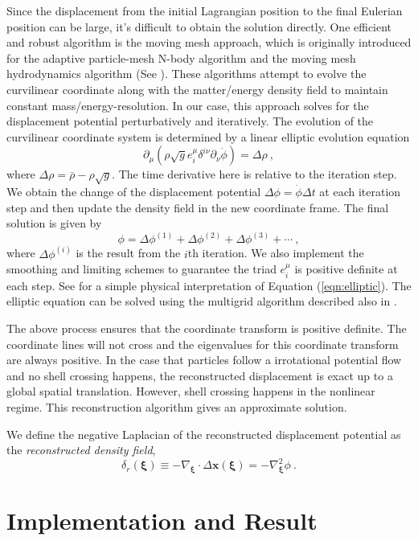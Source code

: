 \documentclass[iop]{emulateapj}
\newcommand{\be}{\begin{equation}}
\newcommand{\ee}{\end{equation}}
\newcommand{\vecx}{{\bm{x}}}
\newcommand{\vecxi}{{\bm{\xi}}}
\begin{document}
{Since the displacement from the initial Lagrangian position to the final Eulerian position can be large,
it's difficult to obtain the solution directly.
One efficient and robust algorithm is the moving mesh approach, which is originally introduced for the adaptive particle-mesh N-body algorithm and the moving mesh hydrodynamics algorithm (See \cite{Pen95,Pen98}).
These algorithms attempt to evolve the curvilinear coordinate along with the matter/energy density field to maintain constant mass/energy-resolution.
In our case, this approach solves for the displacement potential perturbatively and iteratively.
The evolution of the curvilinear coordinate system is determined by a linear elliptic evolution equation
\be
\partial_\mu(\rho\sqrt{g}e^\mu_i\delta^{i\nu}\partial_\nu\dot\phi)=\Delta\rho\ ,
\label{eqn:elliptic}
\ee
where $\Delta\rho=\bar\rho-\rho\sqrt{g}$.
The time derivative here is relative to the iteration step.
We obtain the change of the displacement potential $\Delta\phi=\dot\phi\Delta t$ at each iteration step and then update the density field in the new coordinate frame.
The final solution is given by 
\be
\phi=\Delta\phi^{(1)}+\Delta\phi^{(2)}+\Delta\phi^{(3)}+\cdots\ ,
\ee
where $\Delta\phi^{(i)}$ is the result from the $i$th iteration.
We also implement the smoothing and limiting schemes to guarantee the triad $e^\mu_i$ is positive definite at each step.
See \cite{zhuhm16c} for a simple physical interpretation of Equation (\ref{eqn:elliptic}).
The elliptic equation can be solved using the multigrid algorithm described also in \cite{Pen95}.

The above process ensures that the coordinate transform is positive definite.
The coordinate lines will not cross and the eigenvalues for this coordinate transform are always positive.
In the case that particles follow a irrotational potential flow and no shell crossing happens,
 the reconstructed displacement is exact up to a global spatial translation.
However, shell crossing happens in the nonlinear regime.  This reconstruction algorithm gives an approximate solution.

We define the negative Laplacian of the reconstructed displacement potential as the {\it reconstructed density field},
\be
\delta_r(\vecxi)\equiv-\nabla_\vecxi\cdot\Delta\vecx(\vecxi)=-\nabla_\vecxi^2\phi\ .
\ee



\section{Implementation and Result}
\label{sec:result}

}
\end{document}
